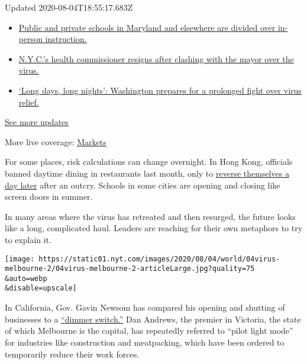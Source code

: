 Updated 2020-08-04T18:55:17.683Z

\begin{itemize}
\tightlist
\item
  \href{https://www.nytimes.com/2020/08/04/world/coronavirus-cases.html?action=click\&pgtype=Article\&state=default\&region=MAIN_CONTENT_1\&context=storylines_live_updates\#link-4825b93}{Public
  and private schools in Maryland and elsewhere are divided over
  in-person instruction.}
\item
  \href{https://www.nytimes.com/2020/08/04/world/coronavirus-cases.html?action=click\&pgtype=Article\&state=default\&region=MAIN_CONTENT_1\&context=storylines_live_updates\#link-4d1eafa8}{N.Y.C.'s
  health commissioner resigns after clashing with the mayor over the
  virus.}
\item
  \href{https://www.nytimes.com/2020/08/04/world/coronavirus-cases.html?action=click\&pgtype=Article\&state=default\&region=MAIN_CONTENT_1\&context=storylines_live_updates\#link-6b644638}{`Long
  days, long nights': Washington prepares for a prolonged fight over
  virus relief.}
\end{itemize}

\href{https://www.nytimes.com/2020/08/04/world/coronavirus-cases.html?action=click\&pgtype=Article\&state=default\&region=MAIN_CONTENT_1\&context=storylines_live_updates}{See
more updates}

More live coverage:
\href{https://www.nytimes.com/live/2020/08/04/business/stock-market-today-coronavirus?action=click\&pgtype=Article\&state=default\&region=MAIN_CONTENT_1\&context=storylines_live_updates}{Markets}

For some places, risk calculations can change overnight. In Hong Kong,
officials banned daytime dining in restaurants last month, only to
\href{https://www.nytimes.com/2020/07/31/world/asia/hongkong-dining-lunch-coronavirus.html}{reverse
themselves a day later} after an outcry. Schools in some cities are
opening and closing like screen doors in summer.

In many areas where the virus has retreated and then resurged, the
future looks like a long, complicated haul. Leaders are reaching for
their own metaphors to try to explain it.

\texttt{[image: https://static01.nyt.com/images/2020/08/04/world/04virus-melbourne-2/04virus-melbourne-2-articleLarge.jpg?quality=75\\\&auto=webp\\\&disable=upscale]}

In California, Gov. Gavin Newsom has compared his opening and shutting
of businesses to a
\href{https://www.nytimes.com/2020/06/30/us/coronavirus-california-cases-rising.html}{``dimmer
switch.''} Dan Andrews, the premier in Victoria, the state of which
Melbourne is the capital, has repeatedly referred to ``pilot light
mode'' for industries like construction and meatpacking, which have been
ordered to temporarily reduce their work forces.

